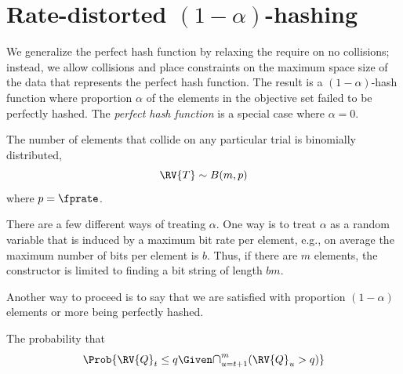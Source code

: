 \documentclass[ ../main.tex]{subfiles}
\begin{document}
\section{Rate-distorted $(1-\alpha)$-hashing}







We generalize the perfect hash function by relaxing the require on no collisions;
instead, we allow collisions and place constraints on the maximum space size of the data that represents the perfect hash function.
The result is a $(1-\alpha)$-hash function where proportion $\alpha$ of the elements in the objective set failed to be perfectly hashed.
The \emph{perfect hash function} is a special case where $\alpha=0$.

The number of elements that collide on any particular trial is binomially distributed,
\begin{equation}
	\RV{T} \sim B(m,p)
\end{equation}
where $p = \fprate$.

There are a few different ways of treating $\alpha$.
One way is to treat $\alpha$ as a random variable that is induced by a maximum bit rate per element, e.g., on average the maximum number of bits per element is $b$.
Thus, if there are $m$ elements, the constructor is limited to finding a bit string of length $b m$.

Another way to proceed is to say that we are satisfied with proportion $(1-\alpha)$ elements or more being perfectly hashed.


The probability that 
\begin{equation}
	\Prob{\RV{Q}_t \leq q \Given \mathlarger{\cap}_{u=t+1}^{m} (\RV{Q}_{u} > q)}
\end{equation}
\end{document}
